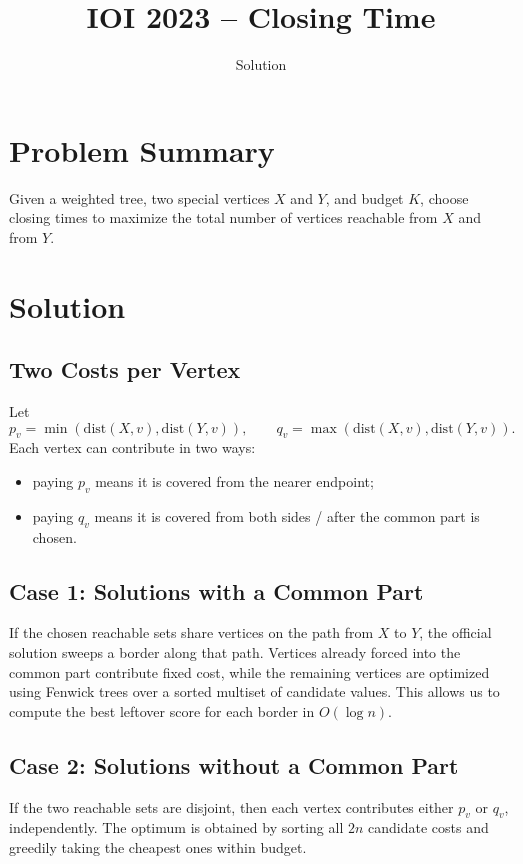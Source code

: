\documentclass[11pt,a4paper]{article}
\title{IOI 2023 -- Closing Time}
\author{Solution}
\date{}
\begin{document}
\maketitle

\section{Problem Summary}
Given a weighted tree, two special vertices $X$ and $Y$, and budget $K$, choose closing times to maximize the total number of vertices reachable from $X$ and from $Y$.

\section{Solution}

\subsection{Two Costs per Vertex}
Let
\[
p_v = \min(\mathrm{dist}(X,v), \mathrm{dist}(Y,v)), \qquad
q_v = \max(\mathrm{dist}(X,v), \mathrm{dist}(Y,v)).
\]
Each vertex can contribute in two ways:
\begin{itemize}
  \item paying $p_v$ means it is covered from the nearer endpoint;
  \item paying $q_v$ means it is covered from both sides / after the common part is chosen.
\end{itemize}

\subsection{Case 1: Solutions with a Common Part}
If the chosen reachable sets share vertices on the path from $X$ to $Y$, the official solution sweeps a border along that path. Vertices already forced into the common part contribute fixed cost, while the remaining vertices are optimized using Fenwick trees over a sorted multiset of candidate values. This allows us to compute the best leftover score for each border in $O(\log n)$.

\subsection{Case 2: Solutions without a Common Part}
If the two reachable sets are disjoint, then each vertex contributes either $p_v$ or $q_v$, independently. The optimum is obtained by sorting all $2n$ candidate costs and greedily taking the cheapest ones within budget.
\end{document}
